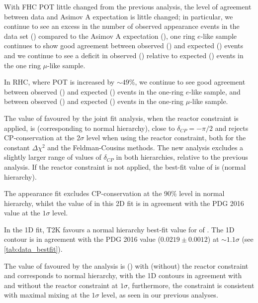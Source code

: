 With FHC POT little changed from the previous analysis, the level of agreement between data and Asimov A expectation is little changed; in particular, we continue to see an excess in the number of observed appearance events in the \nueCConepi data set (\NskObservedNueCConepi{})  compared to the Asimov A expectation (\NAsimovAExpectationNueCConepi{}), one ring $e$-like sample continues to show good agreement between observed (\NskObservedNue{}) and expected (\NAsimovAExpectationNue{}) events and we continue to see a deficit in observed (\NskObservedNumu{}) \color{blue}relative to \color{black} expected (\NAsimovAExpectationNumu) events in the one ring $\mu$-like sample.

In RHC, where POT is increased by $\sim49$\%, we continue to see good agreement between observed (\NskObservedNueBar{}) and expected (\NAsimovAExpectationNueBar{}) events in the one-ring $e$-like sample, and between observed (\NskObservedNumuBar{}) and expected (\NAsimovAExpectationNumuBar) events in the one-ring $\mu$-like sample.

The value of \deltacp favoured by the joint fit analysis, when the reactor constraint is applied, is \BestFitDeltacpwRC (corresponding to normal hierarchy), close to $\delta_{CP} = -\pi / 2$ and rejects CP-conservation at the $2\sigma$ level when using the reactor constraint, both for the constant $\Delta\chi^2$ and the Feldman-Cousins methods. The new analysis excludes a slightly larger range of values of $\delta_{CP}$ in both hierarchies, relative to the previous analysis. If the reactor constraint is not applied, the best-fit value of \deltacp is \BestFitDeltacpwoRC (normal hierarchy).

The appearance fit excludes CP-conservation at the 90\% level in normal hierarchy, whilst the value of \ssqthonethree in this 2D fit is in agreement with the PDG 2016 value at the $1\sigma$ level. 

In the 1D fit, T2K favours a normal hierarchy best-fit value for \ssqthonethree of \BestFitMixingOneThreewoRC. The 1D contour is in agreement with the PDG 2016 value ($0.0219 \pm 0.0012$) at $\sim1.1\sigma$ (see \cref{tab:data_bestfit}).

The value of \ssqthtwothree favoured by the analysis is \BestFitMixingTwoThreewRC (\BestFitMixingTwoThreewoRC) with (without) the reactor constraint and corresponds to normal hierarchy, with the 1D contours in agreement with and without the reactor constraint at $1 \sigma$, furthermore, the constraint is consistent with maximal mixing at the $1\sigma$ level, as seen in our previous analyses.

